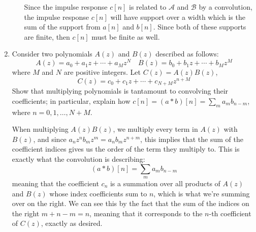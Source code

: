\documentclass[10pt]{article}
\begin{document}
\begin{enumerate}[label=\alph*)]
\begin{enumerate}[label=\alph*)]
					\begin{solution}
						Since the impulse response \( c[n] \) is related to \( \mathcal A \) and \( \mathcal B \) 
						by a convolution, the impulse response \( c[n] \) will have support over a width which is 
						the sum of the support from \( a[n] \) and \( b[n] \). Since both of these supports are 
						finite, then \( c[n] \) must be finite as well.
					\end{solution}
			\end{enumerate}
		\item Consider two polynomials \( A(z) \) and \( B(z) \) described as follows:
			\[
			A(z) = a_0 + a_1z + \cdots + a_M z^{N} \quad B(z) = b_0 + b_1z + \cdots + b_M z^{M}
			\] 
			where \( M \) and \( N \) are positive integers. Let \( C(z) = A(z) B(z) \), 
			\[
			C(z)  = c_0 + c_1z + \cdots + c_{N + M}z^{n + M}
			\] 
			Show that multiplying polynomials is tantamount to convolving their coefficients; in particular, explain 
			how \( c[n] = (a * b)[n] = \sum_m a_m b_{n - m}\), where \( n = 0, 1, \dots, N + M \).

			\begin{solution}
				When multiplying \( A(z) B(z) \), we multiply every term in \( A(z) \) with \( B(z) \), 
				and since \( a_n z^{n} b_m z^{m} = a_n b_m z^{n + m} \), this implies that the sum 
				of the coefficient indices gives us the order of the term they multiply to. This is exactly 
				what the convolution is describing:
				\[
					(a * b) [n] = \sum_m a_m b_{n - m}
				\] 
				meaning that the coefficient \( c_n \) is a summation over all products of \( A(z) \) and \( B(z) \) 
				whose index coefficients sum to \( n \), which is what we're summing over on the right. We can see 
				this by the fact that the sum of the indices on the right \( m + n - m = n \), meaning that 
				it corresponds to the \( n \)-th coefficient of \( C(z) \), exactly as desired.  
			\end{solution}
	\end{enumerate}
\end{document}

